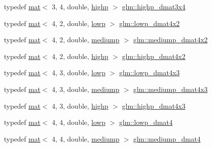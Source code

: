 \begin{DoxyCompactItemize}
\item 
typedef \hyperlink{structglm_1_1mat}{mat}$<$ 3, 4, double, \hyperlink{namespaceglm_a36ed105b07c7746804d7fdc7cc90ff25ac6f7eab42eacbb10d59a58e95e362074}{highp} $>$ \hyperlink{group__core__precision_ga21d3883c59ff3949404de6713e86c89e}{glm\+::highp\+\_\+dmat3x4}
\item 
typedef \hyperlink{structglm_1_1mat}{mat}$<$ 4, 2, double, \hyperlink{namespaceglm_a36ed105b07c7746804d7fdc7cc90ff25ae161af3fc695e696ce3bf69f7332bc2d}{lowp} $>$ \hyperlink{group__core__precision_gaa61cd1362e63979d3e17d53957d2e17f}{glm\+::lowp\+\_\+dmat4x2}
\item 
typedef \hyperlink{structglm_1_1mat}{mat}$<$ 4, 2, double, \hyperlink{namespaceglm_a36ed105b07c7746804d7fdc7cc90ff25a6416f3ea0c9025fb21ed50c4d6620482}{mediump} $>$ \hyperlink{group__core__precision_ga0ef199d025bd14f9fc8f3ebd2b8daaa5}{glm\+::mediump\+\_\+dmat4x2}
\item 
typedef \hyperlink{structglm_1_1mat}{mat}$<$ 4, 2, double, \hyperlink{namespaceglm_a36ed105b07c7746804d7fdc7cc90ff25ac6f7eab42eacbb10d59a58e95e362074}{highp} $>$ \hyperlink{group__core__precision_ga22c6b4fe5bb2e33a3cfa1c026803dd68}{glm\+::highp\+\_\+dmat4x2}
\item 
typedef \hyperlink{structglm_1_1mat}{mat}$<$ 4, 3, double, \hyperlink{namespaceglm_a36ed105b07c7746804d7fdc7cc90ff25ae161af3fc695e696ce3bf69f7332bc2d}{lowp} $>$ \hyperlink{group__core__precision_gaf829f4341a7592475df926eb9b416dd4}{glm\+::lowp\+\_\+dmat4x3}
\item 
typedef \hyperlink{structglm_1_1mat}{mat}$<$ 4, 3, double, \hyperlink{namespaceglm_a36ed105b07c7746804d7fdc7cc90ff25a6416f3ea0c9025fb21ed50c4d6620482}{mediump} $>$ \hyperlink{group__core__precision_ga3c31b359e06498f36aae9bfde929a8ce}{glm\+::mediump\+\_\+dmat4x3}
\item 
typedef \hyperlink{structglm_1_1mat}{mat}$<$ 4, 3, double, \hyperlink{namespaceglm_a36ed105b07c7746804d7fdc7cc90ff25ac6f7eab42eacbb10d59a58e95e362074}{highp} $>$ \hyperlink{group__core__precision_ga9a5dab260df6e8c46c747bac0b8d2f38}{glm\+::highp\+\_\+dmat4x3}
\item 
typedef \hyperlink{structglm_1_1mat}{mat}$<$ 4, 4, double, \hyperlink{namespaceglm_a36ed105b07c7746804d7fdc7cc90ff25ae161af3fc695e696ce3bf69f7332bc2d}{lowp} $>$ \hyperlink{group__core__precision_ga608895f4a515c7ac6cf3a1c2f11e13cc}{glm\+::lowp\+\_\+dmat4}
\item 
typedef \hyperlink{structglm_1_1mat}{mat}$<$ 4, 4, double, \hyperlink{namespaceglm_a36ed105b07c7746804d7fdc7cc90ff25a6416f3ea0c9025fb21ed50c4d6620482}{mediump} $>$ \hyperlink{group__core__precision_ga4b027f0f888d5ec1e77a00cb5517f56a}{glm\+::mediump\+\_\+dmat4}

\end{DoxyCompactItemize}
